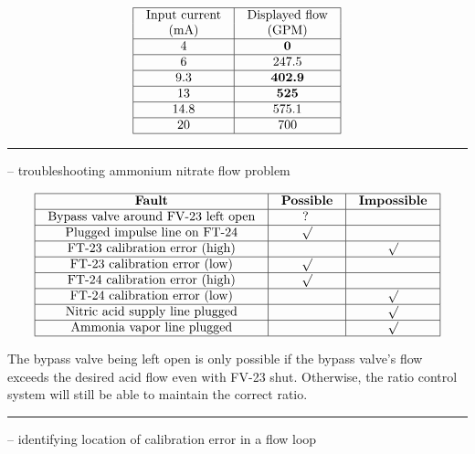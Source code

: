 \begin{itemize}
\begin{itemize}

$$\vbox{\offinterlineskip
\halign{\strut
\vrule \quad\hfil # \ \hfil & 
\vrule \quad\hfil # \ \hfil \vrule \cr
\noalign{\hrule}
%
Input current & Displayed flow \cr
(mA) & (GPM) \cr
%
\noalign{\hrule}
%
4 & {\bf 0} \cr
%
\noalign{\hrule}
%
6 & 247.5 \cr
%
\noalign{\hrule}
%
9.3 & {\bf 402.9} \cr
%
\noalign{\hrule}
%
13 & {\bf 525} \cr
%
\noalign{\hrule}
%
14.8 & 575.1 \cr
%
\noalign{\hrule}
%
20 & 700 \cr
%
\noalign{\hrule}
} %
}$$ %


\filbreak \vskip 5pt \hrule \vskip 5pt  -- troubleshooting ammonium nitrate flow problem \vskip 10pt


$$\vbox{\offinterlineskip
\halign{\strut
\vrule \quad\hfil # \ \hfil & 
\vrule \quad\hfil # \ \hfil & 
\vrule \quad\hfil # \ \hfil \vrule \cr
\noalign{\hrule}
%
{\bf Fault} & {\bf Possible} & {\bf Impossible} \cr
%
\noalign{\hrule}
%
Bypass valve around FV-23 left open & ? &  \cr
%
\noalign{\hrule}
%
Plugged impulse line on FT-24 & $\surd$ &  \cr
%
\noalign{\hrule}
%
FT-23 calibration error (high) &  & $\surd$ \cr
%
\noalign{\hrule}
%
FT-23 calibration error (low) & $\surd$ &  \cr
%
\noalign{\hrule}
%
FT-24 calibration error (high) & $\surd$ &  \cr
%
\noalign{\hrule}
%
FT-24 calibration error (low) &  & $\surd$ \cr
%
\noalign{\hrule}
%
Nitric acid supply line plugged &  & $\surd$ \cr
%
\noalign{\hrule}
%
Ammonia vapor line plugged &  & $\surd$ \cr
%
\noalign{\hrule}
} %
}$$ %

The bypass valve being left open is only possible if the bypass valve's flow exceeds the desired acid flow even with FV-23 shut.  Otherwise, the ratio control system will still be able to maintain the correct ratio.


\filbreak \vskip 5pt \hrule \vskip 5pt  -- identifying location of calibration error in a flow loop \vskip 10pt


\end{itemize}
\end{itemize}
